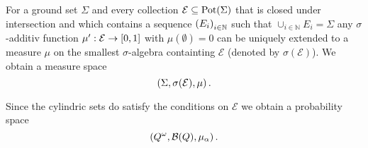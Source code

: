 \begin{theorem}
  \cite[Theorem 2.4, Theorem 5.6]{Bauer}
  For a ground set $\Sigma$ and every collection 
  $\mathcal{E}\subseteq\operatorname{Pot}(\Sigma)$ that is closed under intersection and
  which contains a sequence $\left(E_{i}\right)_{i\in\mathbb{N}}$ such that 
  $\cup_{i\in\mathbb{N}}E_{i} = \Sigma$ any $\sigma$-additiv function 
  $\mu':\mathcal{E}\rightarrow\left[0, 1\right]$
  with $\mu(\emptyset) = 0$ can be uniquely extended to a measure $\mu$ on the 
  smallest $\sigma$-algebra containting $\mathcal{E}$ (denoted by 
  $\sigma(\mathcal{E})$). We obtain a measure space
  \begin{equation*}
    \left(\Sigma, \sigma(\mathcal{E}), \mu\right).
  \end{equation*}
  \label{thm:measureext}
\end{theorem}
Since the cylindric sets do satisfy the conditions on $\mathcal{E}$ we obtain a
probability space
\begin{equation*}
  \left(Q^{\omega}, \mathcal{B}(Q), \mu_{\alpha}\right).
\end{equation*}


